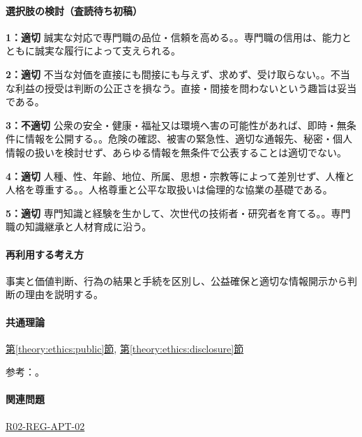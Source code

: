 \paragraph{選択肢の検討（査読待ち初稿）}\mbox{}\par

\noindent\textbf{1：適切} 誠実な対応で専門職の品位・信頼を高める。。専門職の信用は、能力とともに誠実な履行によって支えられる。\par

\noindent\textbf{2：適切} 不当な対価を直接にも間接にも与えず、求めず、受け取らない。。不当な利益の授受は判断の公正さを損なう。直接・間接を問わないという趣旨は妥当である。\par

\noindent\textbf{3：不適切} 公衆の安全・健康・福祉又は環境へ害の可能性があれば、即時・無条件に情報を公開する。。危険の確認、被害の緊急性、適切な通報先、秘密・個人情報の扱いを検討せず、あらゆる情報を無条件で公表することは適切でない。\par

\noindent\textbf{4：適切} 人種、性、年齢、地位、所属、思想・宗教等によって差別せず、人権と人格を尊重する。。人格尊重と公平な取扱いは倫理的な協業の基礎である。\par

\noindent\textbf{5：適切} 専門知識と経験を生かして、次世代の技術者・研究者を育てる。。専門職の知識継承と人材育成に沿う。\par

\paragraph{再利用する考え方} 事実と価値判断、行為の結果と手続を区別し、公益確保と適切な情報開示から判断の理由を説明する。

\paragraph{共通理論} \hyperref[theory:ethics:public]{第\ref*{theory:ethics:public}節}, \hyperref[theory:ethics:disclosure]{第\ref*{theory:ethics:disclosure}節}

\par 参考：\cite{ipej_ethics2011,ipej_ethics2023}。

\paragraph{関連問題} \hyperref[q:r02-reg-apt-02]{R02-REG-APT-02}


